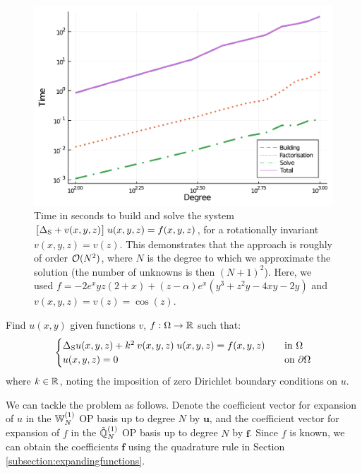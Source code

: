 \documentclass[11pt, oneside]{article}   	%
\begin{document}
\begin{figure}[tp]
	\centering %
	\includegraphics[scale=0.4]{complexity-Nend=1000}
	\caption{Time in seconds to build and solve the system $\big[\Delta_{\rm S} + v(x,y,z) \big] \: u(x,y,z) = f(x,y,z)$, for a rotationally invariant $v(x,y,z) = v(z)$. This demonstrates that the approach is roughly of order $\mathcal{O}(N^2)$, where $N$ is the degree to which we approximate the solution (the number of unknowns is then $(N+1)^2$). Here, we used $f = -2e^{x}yz(2+x) + (z - \alpha) e^{x} (y^3 + z^2 y - 4xy - 2y)$ and $v(x,y,z) = v(z) = \cos(z)$.}
	\label{fig:complexity}
\end{figure}

Find $u(x,y)$ given functions $v$, $f : \Omega \to \mathbb{R}$ such that:
\begin{align}
	\begin{cases}
    		\Delta_{\rm S} u(x,y,z) + k^2 \: v(x,y,z) \; u(x,y,z) = f(x,y,z) &\quad \text{in } \Omega \\
		u(x,y,z) = 0 &\quad \text{on } \partial \Omega
	\end{cases}
	\label{eqn:helmholtz}
\end{align}
where $k \in \mathbb{R}$, noting the imposition of zero Dirichlet boundary conditions on $u$.

We can tackle the problem as follows. Denote the coefficient vector for expansion of $u$ in the $\mathbb{W}_N^{(1)}$ OP basis up to degree $N$ by $\mathbf{u}$, and the coefficient vector for expansion of $f$ in the ${\mathbb{\tilde Q}}^{(1)}_{N}$ OP basis up to degree $N$ by $\mathbf{f}$. Since $f$ is known, we can obtain  the coefficients $\mathbf{f}$ using the quadrature rule in Section \ref{subsection:expandingfunctions}. 
\end{document}
